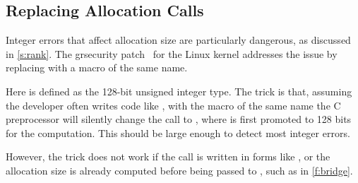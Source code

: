 \subsection{Replacing Allocation Calls}

Integer errors that affect allocation size are particularly dangerous,
as discussed in \autoref{s:rank}.  The grsecurity patch~\cite{grsecurity}
for the Linux kernel addresses the issue by replacing
 with a macro of the same name.
%

%
Here  is defined as the 128-bit unsigned integer
type.  The trick is that, assuming the developer often writes code
like , with the macro of the same name
the C preprocessor will silently change the call to
, where  is first
promoted to 128 bits for the computation.  This should be large
enough to detect most integer errors.

However, the trick does not work if the call is written in forms
like , or the allocation
size is already computed before being passed to , such
as in \autoref{f:bridge}.
